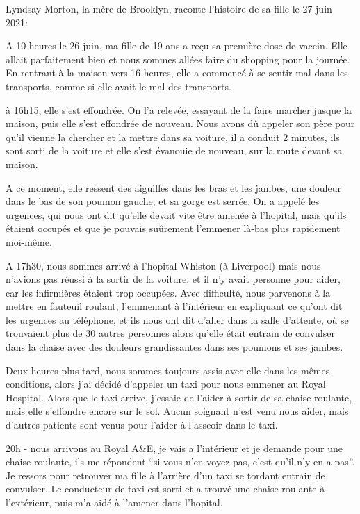 \normalsize

Lyndsay Morton, la mère de Brooklyn, raconte l'histoire de sa fille le 27 juin
2021:

A 10 heures le 26 juin, ma fille de 19 ans a reçu sa première dose de
vaccin. Elle allait parfaitement bien et nous sommes allées faire du shopping
pour la journée. En rentrant à la maison vers 16 heures, elle a commencé à se
sentir mal dans les transports, comme si elle avait le mal des transports.

à 16h15, elle s'est effondrée. On l'a relevée, essayant de la faire marcher
jusque la maison, puis elle s'est effondrée de nouveau. Nous avons dû appeler
son père pour qu'il vienne la chercher et la mettre dans sa voiture, il a
conduit 2 minutes, ils sont sorti de la voiture et elle s'est évanouie de
nouveau, sur la route devant sa maison.

A ce moment, elle ressent des aiguilles dans les bras et les jambes, une douleur
dans le bas de son poumon gauche, et sa gorge est serrée. On a appelé les
urgences, qui nous ont dit qu'elle devait vite être amenée à l'hopital, mais
qu'ils étaient occupés et que je pouvais suûrement l'emmener là-bas plus
rapidement moi-même.

A 17h30, nous sommes arrivé à l'hopital Whiston (à Liverpool) mais nous n'avions
pas réussi à la sortir de la voiture, et il n'y avait personne pour aider, car
les infirmières étaient trop occupées. Avec difficulté, nous parvenons à la
mettre en fauteuil roulant, l'emmenant à l'intérieur en expliquant ce qu'ont dit
les urgences au téléphone, et ils nous ont dit d'aller dans la salle d'attente,
où se trouvaient plus de 30 autres personnes alors qu'elle était entrain de
convulser dans la chaise avec des douleurs grandissantes dans ses poumons et ses
jambes.

Deux heures plus tard, nous sommes toujours assis avec elle dans les mêmes
conditions, alors j'ai décidé d'appeler un taxi pour nous emmener au Royal
Hospital. Alors que le taxi arrive, j'essaie de l'aider à sortir de sa chaise
roulante, mais elle s'effondre encore sur le sol. Aucun soignant n'est venu nous
aider, mais d'autres patients sont venus pour l'aider à l'asseoir dans le taxi.

20h - nous arrivons au Royal A\&E, je vais a l'intérieur et je demande pour une
chaise roulante, ils me répondent “si vous n'en voyez pas, c'est qu'il n'y en a
pas”. Je ressors pour retrouver ma fille à l'arrière d'un taxi se tordant
entrain de convulser. Le conducteur de taxi est sorti et a trouvé une chaise
roulante à l'extérieur, puis m'a aidé à l'amener dans l'hopital.

